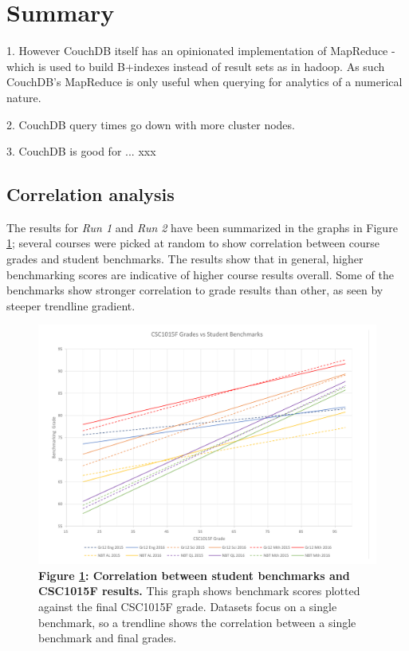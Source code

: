 \section{Summary}
1. However CouchDB itself has an opinionated implementation of MapReduce - which is used to build B+indexes instead of result sets as in hadoop. As such CouchDB's MapReduce is only useful when querying for analytics of a numerical nature.

2. CouchDB query times go down with more cluster nodes.

3. CouchDB is good for ... xxx


\subsection{Correlation analysis}
The results for \textit{Run 1} and \textit{Run 2} have been summarized in the graphs in Figure \ref{run1-chart1}; several courses were picked at random to show correlation between course grades and student benchmarks. The results show that in general, higher benchmarking scores are indicative of higher course results overall. Some of the benchmarks show stronger correlation to grade results than other, as seen by steeper trendline gradient.



\begin{figure}[H]
    \centering
    \begin{mdframed}
        \centering
        \includegraphics[scale=0.55]{./resources/figures/run1-chart1.png}
    \end{mdframed}
    \caption[CSC1015 grade vs benchmark correlation]{\textbf{Figure \ref{run1-chart1}: Correlation between student benchmarks and CSC1015F results.} This graph shows benchmark scores plotted against the final CSC1015F grade. Datasets focus on a single benchmark, so a trendline shows the correlation between a single benchmark and final grades.}
    \label{run1-chart1}
\end{figure}



